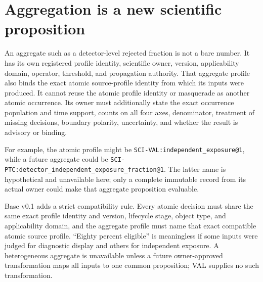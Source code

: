 \documentclass[10pt]{article}
\begin{document}
\clearpage
\section{Aggregation is a new scientific proposition}
\label{sec:rat-aggregation}

An aggregate such as a detector-level rejected fraction is not a bare number.
It has its own registered profile identity, scientific owner, version,
applicability domain, operator, threshold, and propagation authority. That
aggregate profile also binds the exact atomic source-profile identity from
which its inputs were produced. It cannot reuse the atomic profile identity
or masquerade as another atomic occurrence. Its owner must additionally state
the exact occurrence population and time support, counts on all four axes,
denominator, treatment of missing decisions, boundary polarity, uncertainty,
and whether the result is advisory or binding.

For example, the atomic profile might be
\texttt{SCI-VAL:independent\_exposure@1}, while a future aggregate could be
\texttt{SCI-PTC:detector\_independent\_exposure\_fraction@1}. The latter name
is hypothetical and unavailable here; only a complete immutable record from
its actual owner could make that aggregate proposition evaluable.

Base v0.1 adds a strict compatibility rule. Every atomic decision must share
the same exact profile identity and version, lifecycle stage, object type, and
applicability domain, and the aggregate profile must name that exact compatible
atomic source profile. ``Eighty percent eligible'' is meaningless if some inputs
were judged for diagnostic display and others for independent exposure. A
heterogeneous aggregate is unavailable unless a future owner-approved
transformation maps all inputs to one common proposition; VAL supplies no such
transformation.

\begin{center}
\end{center}
\end{document}
